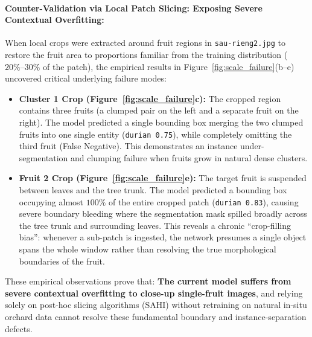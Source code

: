 \documentclass[12pt,a4paper]{article}
\begin{document}
\paragraph{Counter-Validation via Local Patch Slicing: Exposing Severe Contextual Overfitting:}
When local crops were extracted around fruit regions in \texttt{sau-rieng2.jpg} to restore the fruit area to proportions familiar from the training distribution ($20\%\text{--}30\%$ of the patch), the empirical results in Figure~\ref{fig:scale_failure}(b--e) uncovered critical underlying failure modes:
\begin{itemize}
    \item \textbf{Cluster 1 Crop (Figure~\ref{fig:scale_failure}c):} The cropped region contains three fruits (a clumped pair on the left and a separate fruit on the right). The model predicted a single bounding box merging the two clumped fruits into one single entity (\texttt{durian 0.75}), while completely omitting the third fruit (False Negative). This demonstrates an instance under-segmentation and clumping failure when fruits grow in natural dense clusters.
    \item \textbf{Fruit 2 Crop (Figure~\ref{fig:scale_failure}e):} The target fruit is suspended between leaves and the tree trunk. The model predicted a bounding box occupying almost $100\%$ of the entire cropped patch (\texttt{durian 0.83}), causing severe boundary bleeding where the segmentation mask spilled broadly across the tree trunk and surrounding leaves. This reveals a chronic ``crop-filling bias'': whenever a sub-patch is ingested, the network presumes a single object spans the whole window rather than resolving the true morphological boundaries of the fruit.
\end{itemize}
These empirical observations prove that: \textbf{The current model suffers from severe contextual overfitting to close-up single-fruit images}, and relying solely on post-hoc slicing algorithms (SAHI) without retraining on natural in-situ orchard data cannot resolve these fundamental boundary and instance-separation defects.
\end{document}
